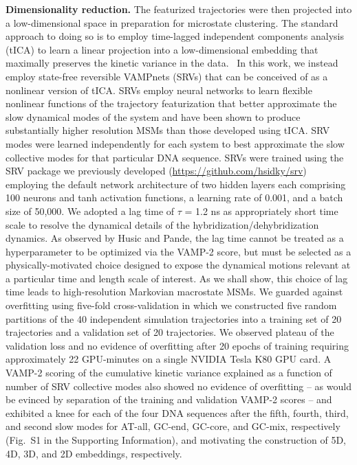 \documentclass[journal=jpcbfk,manuscript=article]{achemso}
\newcommand*{\rood}[1]{{#1}}
\newcommand*{\blauw}[1]{{#1}}
\begin{document}
\textbf{Dimensionality reduction.} The featurized trajectories were then projected into a low-dimensional space in preparation for microstate clustering. The standard approach to doing so is to employ time-lagged independent components analysis (tICA) to learn a linear projection into a low-dimensional embedding that maximally preserves the kinetic variance in the data.~\citep{Perez-Hernandez2013IdentificationConstruction, Schwantes2013ImprovementsNTL9, Noe2015KineticSimulation} In this work, we instead employ state-free reversible VAMPnets (SRVs) that can be conceived of as a nonlinear version of tICA. \citep{Chen} SRVs employ neural networks to learn flexible nonlinear functions of the trajectory featurization that better approximate the slow dynamical modes of the system and have been shown to produce substantially higher resolution MSMs than those developed using tICA.\citep{Chen, Sidky2019High-ResolutionVAMPnets} SRV modes were learned independently for each system to best approximate the slow collective modes for that particular DNA sequence. SRVs were trained using the SRV package we previously developed (\url{https://github.com/hsidky/srv}) employing the default network architecture of two hidden layers each comprising 100 neurons and tanh activation functions, a learning rate of 0.001, and a batch size of 50,000. We adopted a lag time of $\tau$ = 1.2 ns as appropriately short time scale to resolve the dynamical details of the hybridization/dehybridization dynamics. \citep{Phys2011MarkovValidation} As observed by Husic and Pande, the lag time cannot be treated as a hyperparameter to be optimized via the VAMP-2 score, but must be selected as a physically-motivated choice designed to expose the dynamical motions relevant at a particular time and length scale of interest. \citep{Husic2017Note:Selection} As we shall show, this choice of lag time leads to high-resolution Markovian macrostate MSMs. We guarded against overfitting using five-fold cross-validation in which we \rood{constructed five random partitions of the 40 independent simulation trajectories into a training set of 20 trajectories and a validation set of 20 trajectories}.\citep{Sidky2019High-ResolutionVAMPnets} We observed plateau of the validation loss and no evidence of overfitting after 20 epochs of training requiring approximately 22 GPU-minutes on a single NVIDIA Tesla K80 GPU card. A VAMP-2 scoring of the cumulative kinetic variance explained as a function of number of SRV collective modes also showed no evidence of overfitting -- as would be evinced by separation of the training and validation VAMP-2 scores \citep{Sidky2019High-ResolutionVAMPnets} -- and exhibited a knee for each of the four DNA sequences after the fifth, fourth, third, and second slow modes for AT-all, GC-end, GC-core, and GC-mix, respectively (\blauw{Fig.~S1} in the \blauw{Supporting Information}), and motivating the construction of 5D, 4D, 3D, and 2D embeddings, respectively.
\end{document}
